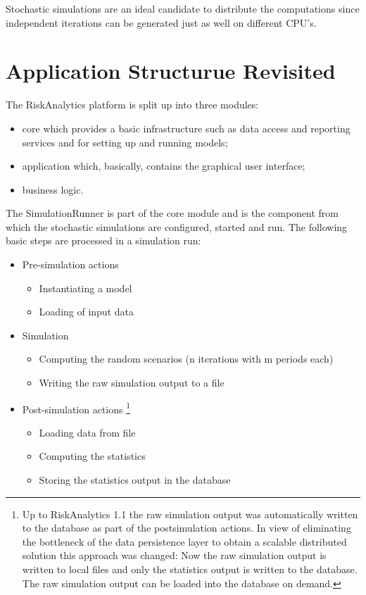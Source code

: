 Stochastic simulations are an ideal candidate to distribute the computations since independent iterations can
be generated just as well on different CPU's.

\section{Application Structurue Revisited}
\label{sec:devguide-app-struct}
The RiskAnalytics platform is split up into three modules:
\begin{itemize}
 \item core which provides a basic infrastructure such as data access and reporting services and for setting up
    and running models;
 \item application which, basically, contains the graphical user interface;
 \item business logic.
\end{itemize}

The SimulationRunner is part of the core module and is the component from which the stochastic simulations are
configured, started and run. The following basic steps are processed in a simulation run:
\begin{itemize}
 \item Pre-simulation actions
  \begin{itemize}
   \item Instantiating a model
   \item Loading of input data
  \end{itemize}
 \item Simulation
  \begin{itemize}
   \item Computing the random scenarios (n iterations with m periods each)
   \item Writing the raw simulation output to a file
  \end{itemize}
 \item Post-simulation actions \footnote{Up to RiskAnalytics 1.1 the raw simulation output was automatically written to the database
       as part of the postsimulation actions. In view of eliminating the bottleneck of the data persistence layer to obtain a scalable
       distributed solution this approach was changed: Now the raw simulation output is written to local files and only the statistics
       output is written to the database. The raw simulation output can be loaded into the database on demand.}
  \begin{itemize}
   \item Loading data from file
   \item Computing the statistics
   \item Storing the statistics output in the database
  \end{itemize}

\end{itemize}

